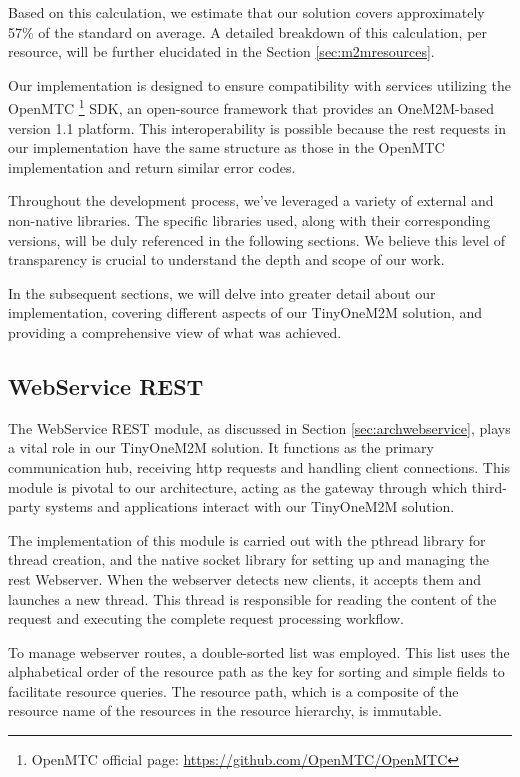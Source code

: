 \documentclass[a4paper,fleqn]{cas-dc}
\begin{document}
Based on this calculation, we estimate that our solution covers approximately 57\% of the standard on average. A detailed breakdown of this calculation, per resource, will be further elucidated in the Section \ref{sec:m2mresources}.

Our implementation is designed to ensure compatibility with services utilizing the OpenMTC \footnote{OpenMTC official page: \url{https://github.com/OpenMTC/OpenMTC}} SDK, an open-source framework that provides an OneM2M-based version 1.1 platform. This interoperability is possible because the \gls{rest} requests in our implementation have the same structure as those in the OpenMTC implementation and return similar error codes.

Throughout the development process, we've leveraged a variety of external and non-native libraries. The specific libraries used, along with their corresponding versions, will be duly referenced in the following sections. We believe this level of transparency is crucial to understand the depth and scope of our work.

In the subsequent sections, we will delve into greater detail about our implementation, covering different aspects of our TinyOneM2M solution, and providing a comprehensive view of what was achieved.

\subsection{WebService REST}

The WebService REST module, as discussed in Section \ref{sec:archwebservice}, plays a vital role in our TinyOneM2M solution. It functions as the primary communication hub, receiving \gls{http} requests and handling client connections. This module is pivotal to our architecture, acting as the gateway through which third-party systems and applications interact with our TinyOneM2M solution.

The implementation of this module is carried out with the pthread library for thread creation, and the native socket library for setting up and managing the \gls{rest} Webserver. When the webserver detects new clients, it accepts them and launches a new thread. This thread is responsible for reading the content of the request and executing the complete request processing workflow.

To manage webserver routes, a double-sorted list was employed. This list uses the alphabetical order of the resource path as the key for sorting and simple fields to facilitate resource queries. The resource path, which is a composite of the resource name of the resources in the resource hierarchy, is immutable.
\end{document}
